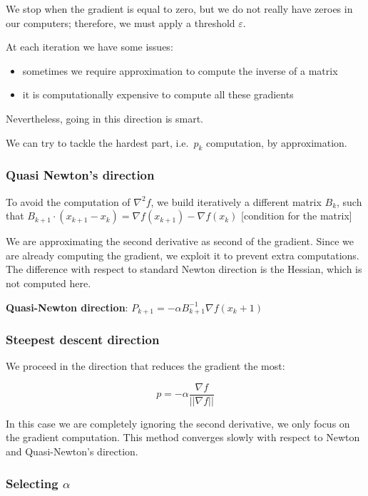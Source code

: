 We stop when the gradient is equal to zero, but we do not really have
zeroes in our computers; therefore, we must apply a threshold
$\varepsilon$.

At each iteration we have some issues:

\begin{itemize}
\tightlist
\item
  sometimes we require approximation to compute the inverse of a matrix
\item
  it is computationally expensive to compute all these gradients
\end{itemize}

Nevertheless, going in this direction is smart.

We can try to tackle the hardest part, i.e.~$p_k$ computation, by
approximation.

\hypertarget{quasi-newtons-direction}{%
\subsubsection{Quasi Newton's direction}\label{quasi-newtons-direction}}

To avoid the computation of $\nabla^2 f$, we build iteratively a
different matrix $B_k$, such that
$B_{k+1}\cdot (x_{k+1}-x_k) = \nabla f(x_{k+1})-\nabla f(x_k)$
{[}condition for the matrix{]}

We are approximating the second derivative as second of the gradient.
Since we are already computing the gradient, we exploit it to prevent
extra computations. The difference with respect to standard Newton
direction is the Hessian, which is not computed here.

\textbf{Quasi-Newton direction}:
$P_{k+1}=- \alpha B_{k+1}^{-1} \nabla f(x_k+1)$

\hypertarget{steepest-descent-direction}{%
\subsubsection{Steepest descent
direction}\label{steepest-descent-direction}}

We proceed in the direction that reduces the gradient the most:

$$
p= -\alpha \frac{\nabla f}{||\nabla f||}
$$

In this case we are completely ignoring the second derivative, we only
focus on the gradient computation. This method converges slowly with
respect to Newton and Quasi-Newton's direction.

\hypertarget{selecting-alpha}{%
\subsubsection{\texorpdfstring{Selecting
$\alpha$}{Selecting }}\label{selecting-alpha}}

